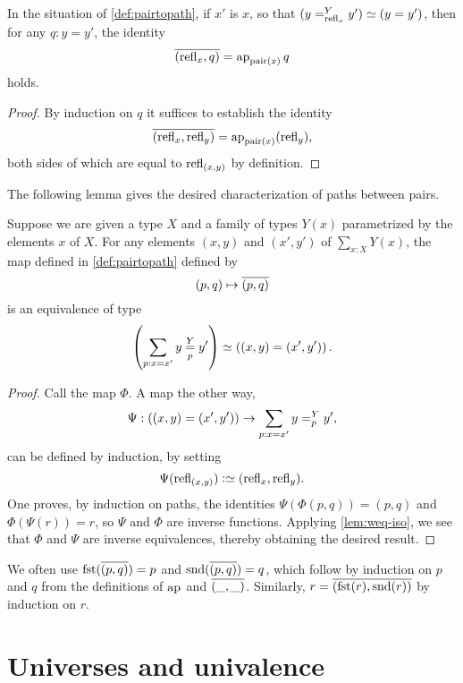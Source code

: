 \begin{lemma}\label{cor:isEq-pair=}
  In the situation of \cref{def:pairtopath}, if $x'$ is $x$, so that $( \pathover y Y {\refl x} {y'} ) \jdeq ( y = y' )$,
  then for any $q : y = y'$, the identity $$\pathpair {\refl x} q = \ap {\pair (x)} q$$ holds.
\end{lemma}

\begin{proof}
  By induction on $q$ it suffices to establish the identity $$\pathpair {\refl x} {\refl y} = \ap {\pair (x)} (\refl y),$$ both sides of which are
  equal to $\refl {(x,y)}$ by definition.
\end{proof}

The following lemma gives the desired characterization of paths between pairs.

\begin{lemma}\label{lem:isEq-pair=}
  Suppose we are given a type $X$ and a family of types $Y(x)$ parametrized by the elements $x$ of $X$.
  For any elements $(x,y)$ and $(x',y')$ of $\sum _{x:X} Y(x)$,
  the map defined in \cref{def:pairtopath} defined by $$(p,q) \mapsto \overline{({p},{q})}$$ is an equivalence of type
  $$\left( \sum_{p:x=x'} {y} \overset{Y}{\underset{p}=} y' \right) \simeq \left ( (x,y) = (x',y') \right ).$$
\end{lemma}

\begin{proof}
  Call the map $\Phi$.
  A map the other way, $$ \Psi : ((x,y) = (x',y')) \to \sum_{p:x=x'} y =^{Y}_{p} y', $$
  can be defined by induction, by setting $$\Psi (\refl {(x,y)}) \defeq (\refl x, \refl y).$$
  One proves, by induction on paths, the identities $ \Psi ( \Phi (p,q) ) = (p,q) $ and $ \Phi (\Psi ( r )) = r$, so $\Psi$ and $\Phi$ are inverse functions.
  Applying \cref{lem:weq-iso}, we see that $\Phi$ and $\Psi$ are inverse equivalences, thereby obtaining the desired result.
\end{proof}

We often use $\fst(\pathpair p q) = p$ and $\snd(\pathpair p q) = q$,
which follow by induction on $p$ and $q$ from the definitions of $\ap{}$ and $\overline{({\_},{\_})}$.
Similarly, $r=\pathpair {\fst(r)}{\snd(r)}$ by induction on $r$.


\section{Universes and univalence}\label{sec:univax}

